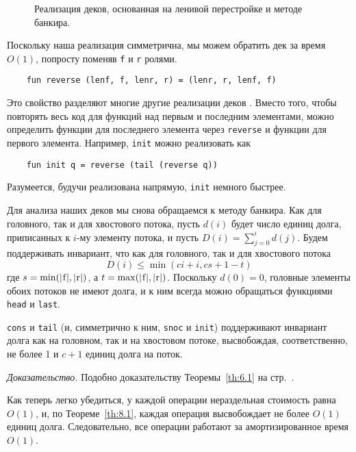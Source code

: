 \begin{figure}
  \centering

  \caption{Реализация деков, основанная на ленивой перестройке и методе банкира.}
  \label{fig:8.3}
\end{figure}

\begin{remark}
  Поскольку наша реализация симметрична, мы можем обратить дек за
  время $O(1)$, попросту поменяв \lstinline!f! и \lstinline!r! ролями.
  \begin{lstlisting}
    fun reverse (lenf, f, lenr, r) = (lenr, r, lenf, f)
  \end{lstlisting}
  Это свойство разделяют многие другие реализации деков
  \cite{Hoogerwoord1992, ChuangGoldberg1993}. Вместо того, чтобы
  повторять весь код для функций над первым и последним элементами,
  можно определить функции для последнего элемента через
  \lstinline!reverse! и функции для первого элемента. Например,
  \lstinline!init! можно реализовать как
  \begin{lstlisting}
    fun init q = reverse (tail (reverse q))
  \end{lstlisting}
  Разумеется, будучи реализована напрямую, \lstinline!init! немного быстрее.
\end{remark}

Для анализа наших деков мы снова обращаемся к методу банкира. Как для
головного, так и для хвостового потока, пусть $d(i)$ будет число
единиц долга, приписанных к $i$-му элементу потока, и пусть
$D(i) = \sum_{j=0}^i d(j)$. Будем поддерживать инвариант, что как для
головного, так и для хвостового потока
$$
D(i) \le \min(ci + i, cs + 1 - t)
$$
где $s = \min(|\lstinline!f!|,|\lstinline!r!|)$, а
$t = \max(|\lstinline!f!|, |\lstinline!r!|)$. Поскольку $d(0) = 0$,
головные элементы обоих потоков не имеют долга, и к ним всегда
можно обращаться функциями \lstinline!head! и \lstinline!last!.
\begin{theorem}\label{th:8.1}
  \lstinline!cons! и \lstinline!tail! (и, симметрично к ним,
  \lstinline!snoc! и \lstinline!init!) поддерживают инвариант долга
  как на головном, так и на хвостовом потоке, высвобождая,
  соответственно, не более 1 и $c+1$ единиц долга на поток.

  \emph{Доказательство.} Подобно доказательству Теоремы~\ref{th:6.1}
  на стр.~\pageref{th:6.1}.
\end{theorem}

Как теперь легко убедиться, у каждой операции нераздельная стоимость
равна $O(1)$, и, по Теореме~\ref{th:8.1}, каждая операция высвобождает
не более $O(1)$ единиц долга. Следовательно, все операции работают за
амортизированное время $O(1)$.

